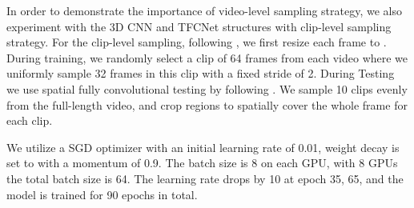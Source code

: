 \documentclass[nohyperref]{article}
\theoremstyle{plain}
\theoremstyle{definition}
\theoremstyle{remark}
\begin{document}
{{In order to demonstrate the importance of video-level sampling strategy,  we also experiment with the 3D CNN and TFCNet structures with clip-level sampling strategy. For the clip-level sampling, following \cite{DBLP:journals/corr/abs-1812-03982}, we first resize each frame to . During training, we randomly select a clip of 64 frames from each video where we uniformly sample 32 frames in this clip with a fixed stride of 2. During Testing we use spatial fully convolutional testing by following \cite{DBLP:conf/cvpr/0004GGH18,DBLP:conf/nips/YueSYZDX18,DBLP:journals/corr/abs-1812-03982}. We
sample 10 clips evenly from the full-length video, and crop   regions to spatially cover the whole frame for each clip. 


 We utilize a SGD optimizer with an initial learning rate of 0.01, weight decay is set to  with a momentum of 0.9. The batch size is 8 on each GPU, with 8 GPUs the total batch size is 64. The learning rate drops by 10 at epoch 35, 65, and the model is trained for 90 epochs in total.
\begin{table*}[t]\centering
{}\hspace{3mm}
\end{table*}}}
\end{document}
